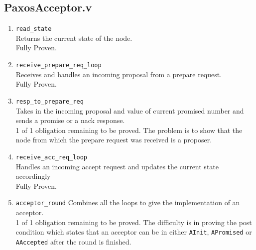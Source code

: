 \subsection{PaxosAcceptor.v}
\begin{enumerate}
  \item \texttt{read\_state} \\
    Returns the current state of the node. \\
    Fully Proven.
  \item \texttt{receive\_prepare\_req\_loop} \\
    Receives and handles an incoming proposal from
    a prepare request. \\
    Fully Proven.
  \item \texttt{resp\_to\_prepare\_req} \\
    Takes in the incoming proposal and value of current promised number
    and sends a promise or a nack response. \\
    1 of 1 obligation remaining to be proved. The problem is to show that
    the node from which the prepare request was received is a proposer.
  \item \texttt{receive\_acc\_req\_loop} \\
    Handles an incoming accept request and updates the current state accordingly \\
    Fully Proven.
  \item \texttt{acceptor\_round}
    Combines all the loops to give the implementation of an acceptor. \\
    1 of 1 obligation remaining to be proved. The difficulty is in proving
    the post condition which states that an acceptor can be in either \texttt{AInit},
    \texttt{APromised} or \texttt{AAccepted} after the round is finished.
\end{enumerate}

\vspace{-5mm}
